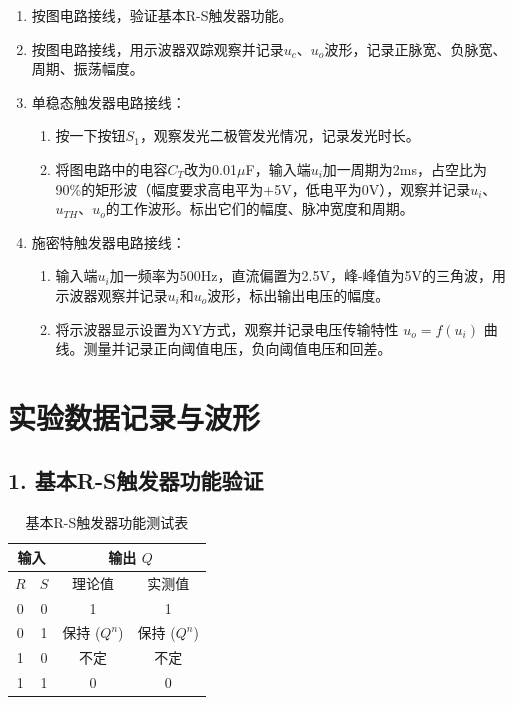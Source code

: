 ﻿\documentclass[10.5pt]{config}
\begin{document}
\begin{enumerate}[label=\arabic*., leftmargin=2em]
    \item 按图电路接线，验证基本R-S触发器功能。
    \item 按图电路接线，用示波器双踪观察并记录$u_c$、$u_o$波形，记录正脉宽、负脉宽、周期、振荡幅度。
    \item 单稳态触发器电路接线：
    \begin{enumerate}
        \item 按一下按钮$S_1$，观察发光二极管发光情况，记录发光时长。
        \item 将图电路中的电容$C_T$改为0.01$\mu$F，输入端$u_i$加一周期为2ms，占空比为90\%的矩形波（幅度要求高电平为+5V，低电平为0V），观察并记录$u_i$、$u_{TH}$、$u_o$的工作波形。标出它们的幅度、脉冲宽度和周期。
    \end{enumerate}
    \item 施密特触发器电路接线：
    \begin{enumerate}
        \item 输入端$u_i$加一频率为500Hz，直流偏置为2.5V，峰-峰值为5V的三角波，用示波器观察并记录$u_i$和$u_o$波形，标出输出电压的幅度。
        \item 将示波器显示设置为XY方式，观察并记录电压传输特性 $u_o = f(u_i)$ 曲线。测量并记录正向阈值电压，负向阈值电压和回差。
    \end{enumerate}
\end{enumerate}

\section{实验数据记录与波形}

\subsection*{1. 基本R-S触发器功能验证}
\begin{table}[H]
    \centering
    \caption{基本R-S触发器功能测试表}
    \begin{tabular}{|c|c|c|c|}
        \hline
        \multicolumn{2}{|c|}{输入} & \multicolumn{2}{c|}{输出 $Q$} \\ \hline
        $R$ & $S$ & 理论值 & 实测值 \\ \hline
        0 & 0 & 1 & 1 \\ \hline
        0 & 1 & 保持 ($Q^n$) & 保持 ($Q^n$) \\ \hline
        1 & 0 & 不定 & 不定 \\ \hline
        1 & 1 & 0 & 0 \\ \hline
    \end{tabular}
\end{table}
\end{document}
